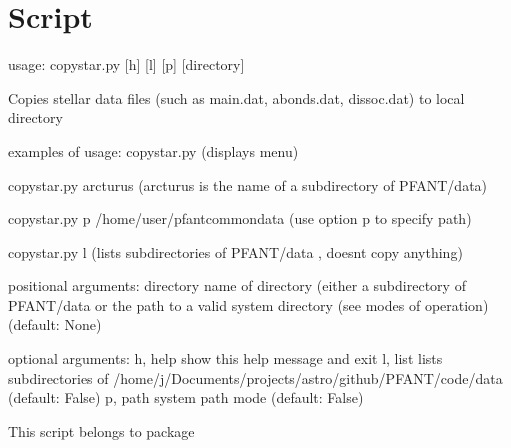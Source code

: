 \documentclass[letterpaper,10pt,english]{sphinxmanual}
\begin{document}
\section{Script }
\label{\detokenize{autoscripts/script-copy-star::doc}}\label{\detokenize{autoscripts/script-copy-star:script-copy-star-py}}
\begin{sphinxVerbatim}[commandchars=\\\{\}]
usage: copy\PYGZhy{}star.py [\PYGZhy{}h] [\PYGZhy{}l] [\PYGZhy{}p] [directory]

Copies stellar data files (such as main.dat, abonds.dat, dissoc.dat) to local directory

examples of usage:
  \PYGZgt{} copy\PYGZhy{}star.py
  (displays menu)

  \PYGZgt{} copy\PYGZhy{}star.py arcturus
  (\PYGZdq{}arcturus\PYGZdq{} is the name of a subdirectory of PFANT/data)

  \PYGZgt{} copy\PYGZhy{}star.py \PYGZhy{}p /home/user/pfant\PYGZhy{}common\PYGZhy{}data
  (use option \PYGZdq{}\PYGZhy{}p\PYGZdq{} to specify path)

  \PYGZgt{} copy\PYGZhy{}star.py \PYGZhy{}l
  (lists subdirectories of PFANT/data , doesn\PYGZsq{}t copy anything)

positional arguments:
  directory   name of directory (either a subdirectory of PFANT/data or the
              path to a valid system directory (see modes of operation)
              (default: None)

optional arguments:
  \PYGZhy{}h, \PYGZhy{}\PYGZhy{}help  show this help message and exit
  \PYGZhy{}l, \PYGZhy{}\PYGZhy{}list  lists subdirectories of
              /home/j/Documents/projects/astro/github/PFANT/code/data
              (default: False)
  \PYGZhy{}p, \PYGZhy{}\PYGZhy{}path  system path mode (default: False)
\end{sphinxVerbatim}

This script belongs to package 
\end{document}
